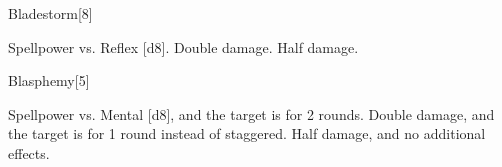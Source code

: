 \begin{spellsection}{Bladestorm}[8]
    \begin{spellheader}
    \end{spellheader}
    \begin{spellcontent}
        \begin{spelltargetinginfo}
        \end{spelltargetinginfo}
        \begin{spelleffects}
            \begin{spellattack}{Spellpower vs. Reflex}
                \spellsuccess {}[d8].
                \spellcritical Double damage.
                \spellfailure Half damage.
            \end{spellattack}
        \end{spelleffects}
    \end{spellcontent}
    \begin{spellfooter}
        \miscastexplode
    \end{spellfooter}
\end{spellsection}

\begin{spellsection}{Blasphemy}[5]
    \begin{spellheader}
    \end{spellheader}
    \begin{spellcontent}
        \begin{spelltargetinginfo}
        \end{spelltargetinginfo}
        \begin{spelleffects}
            \begin{spellattack}{Spellpower vs. Mental}
                \spellsuccess {}[d8], and the target is \staggered for 2 rounds.
                \spellcritical Double damage, and the target is \nauseated for 1 round instead of staggered.
                \spellfailure Half damage, and no additional effects.
            \end{spellattack}
        \end{spelleffects}
    \end{spellcontent}
    \begin{spellfooter}
        \miscastexplode
    \end{spellfooter}
    \begin{spellaugments}
    \end{spellaugments}
\end{spellsection}

